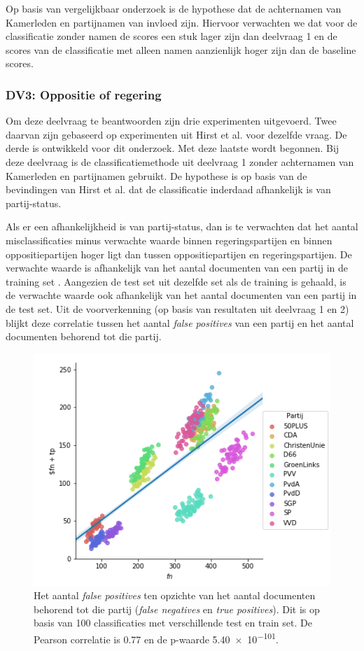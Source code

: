 Op basis van vergelijkbaar onderzoek is de hypothese dat de achternamen van Kamerleden en partijnamen van invloed zijn. Hiervoor verwachten we dat voor de classificatie zonder namen de scores een stuk lager zijn dan deelvraag 1 en de scores van de classificatie met alleen namen aanzienlijk hoger zijn dan de baseline scores.

\subsubsection{DV3: Oppositie of regering}

Om deze deelvraag te beantwoorden zijn drie experimenten uitgevoerd. Twee daarvan zijn gebaseerd op experimenten uit Hirst et al. \cite{Hirst_textto} voor dezelfde vraag. De derde is ontwikkeld voor dit onderzoek. Met deze laatste wordt begonnen. Bij deze deelvraag is de classificatiemethode uit deelvraag 1 zonder achternamen van Kamerleden en partijnamen gebruikt. De hypothese is op basis van de bevindingen van Hirst et al. dat de classificatie inderdaad afhankelijk is van partij-status.\par
Als er een afhankelijkheid is van partij-status, dan is te verwachten dat het aantal misclassificaties minus verwachte waarde binnen regeringspartijen en binnen oppositiepartijen hoger ligt dan tussen oppositiepartijen en regeringspartijen. De verwachte waarde is afhankelijk van het aantal documenten van een partij in de training set \cite{Sahare}. Aangezien de test set uit dezelfde set als de training is gehaald, is de verwachte waarde ook afhankelijk van het aantal documenten van een partij in de test set. Uit de voorverkenning (op basis van resultaten uit deelvraag 1 en 2) blijkt deze correlatie tussen het aantal \textit{false positives} van een partij en het aantal documenten behorend tot die partij.
\begin{figure}[H]
  \centering
    \includegraphics[width=0.60\paperwidth]{Verslag/Handmatig/Correlation.png}
\caption{Het aantal \textit{false positives} ten opzichte van het aantal documenten behorend tot die partij (\textit{false negatives} en \textit{true positives}). Dit is op basis van 100 classificaties met verschillende test en train set. De Pearson correlatie is 0.77 en de p-waarde \num{5.40e-101}.}
\label{fig:correlation}
\end{figure}
